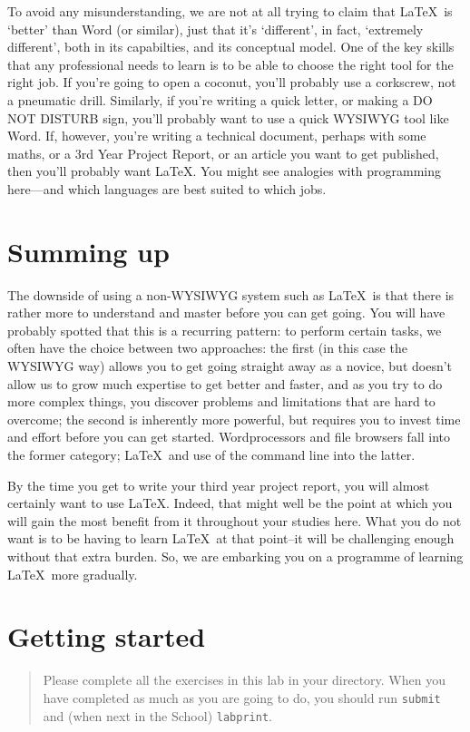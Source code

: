 \begin{refsection}
To avoid any  misunderstanding, we are not at all trying to claim that \LaTeX\ is `better' than Word (or similar), just that it's `different', in fact, `extremely different', both in its capabilties, and its conceptual model. One of the key skills that any professional needs to learn is to be able to choose the right tool for the right job. If you're going to open a coconut, you'll probably use a corkscrew, not a pneumatic drill. Similarly, if you're writing a quick letter, or making a DO NOT DISTURB sign, you'll probably want to use a quick WYSIWYG tool like Word. If, however, you're writing a technical document, perhaps with some maths, or a 3rd Year Project Report, or an article you want to get published, then you'll probably want \LaTeX.  You might see analogies with programming here---and which languages are best suited to which jobs.

\section{Summing up}
\label{section:getting-started}
The downside of using a non-WYSIWYG system such as \LaTeX\ is that there is rather more to understand and master before you can get going. You will have probably spotted that this is a recurring pattern: to perform certain tasks, we often have the choice between two approaches: the first (in this case the WYSIWYG way) allows you to get going straight away as a novice, but doesn't allow us to grow much expertise to get better and faster, and as you try to do more complex things, you discover problems and limitations that are hard to overcome; the second is inherently more powerful, but requires you to invest time and effort before you can get started. Wordprocessors and file browsers fall into the former category; \LaTeX\ and use of the command line into the latter.

By the time you get to write your third year project report, you will almost certainly want to use \LaTeX. Indeed, that might well be the point at which you will gain the most benefit from it throughout your studies here. What you do not want is to be having to learn \LaTeX\ at that point--it will be challenging enough without that extra burden. So, we are embarking you on a programme of learning \LaTeX\ more gradually.


\section{Getting started}
\begin{quote}
  \large
  Please complete all the exercises in this lab in your  directory. When you have completed as much as you are going to do, you should run \texttt{submit} and (when next in the School) \texttt{labprint}.
  

\end{quote}
\end{refsection}
